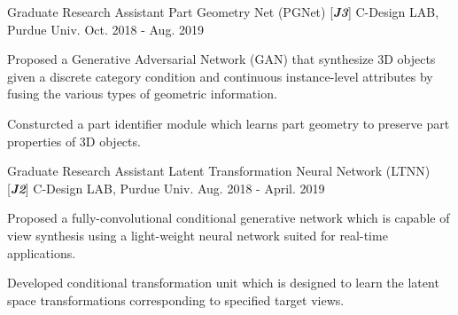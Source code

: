 \begin{cventries}

\cventry
{Graduate Research Assistant} %
{Part Geometry Net (PGNet) [\textit{\textbf{J3}}]} %
{C-Design LAB, Purdue Univ.} %
{Oct. 2018 - Aug. 2019} %
{ %
\begin{cvitems}
\item {Proposed a Generative Adversarial Network (GAN) that synthesize 3D objects given a discrete category condition and continuous instance-level attributes by fusing the various types of geometric information.}
\item {Consturcted a part identifier module which learns part geometry to preserve part properties of 3D objects.}
\end{cvitems}
}


\cventry
{Graduate Research Assistant} %
{Latent Transformation Neural Network (LTNN) [\textit{\textbf{J2}}]} %
{C-Design LAB, Purdue Univ.} %
{Aug. 2018 - April. 2019} %
{ %
\begin{cvitems}
\item {Proposed a fully-convolutional conditional generative network which is capable of view synthesis using a light-weight neural network suited for real-time applications.}
\item {Developed conditional transformation unit which is designed to learn the latent space transformations corresponding to specified target views.}
\end{cvitems}
}





\end{cventries}
